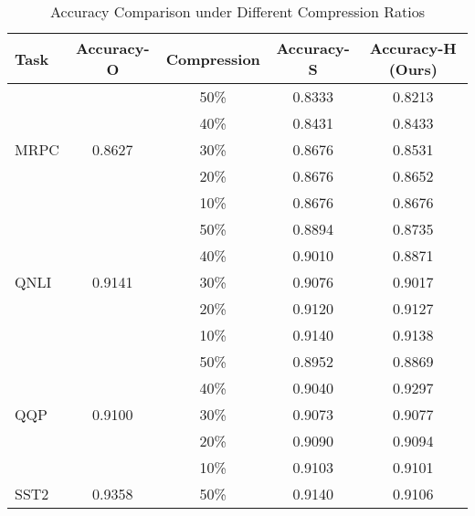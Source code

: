 \documentclass{article}
\begin{document}
\begin{table}[htbp]
\centering
\caption{Accuracy Comparison under Different Compression Ratios}
\begin{tabular}{lcccc}
\toprule
Task & Accuracy-O & Compression & Accuracy-S & \textbf{Accuracy-H (Ours)} \\
\midrule
\multirow{5}{*}{MRPC} 
     & \multirow{5}{*}{0.8627} & 50\% & \cellcolor{lightgray}0.8333 & \cellcolor{darkgray}0.8213 \\ %
     &                         & 40\% & \cellcolor{lightgray}0.8431 & \cellcolor{darkgray}0.8433 \\ %
     &                         & 30\% & \cellcolor{lightgray}0.8676 & \cellcolor{darkgray}0.8531 \\ %
     &                         & 20\% & \cellcolor{lightgray}0.8676 & \cellcolor{darkgray}0.8652 \\
     &                         & 10\% & \cellcolor{lightgray}0.8676 & \cellcolor{darkgray}0.8676 \\
\midrule
\multirow{5}{*}{QNLI} 
     & \multirow{5}{*}{0.9141} & 50\% & \cellcolor{lightgray}0.8894 & \cellcolor{darkgray}0.8735 \\
     &                         & 40\% & \cellcolor{lightgray}0.9010 & \cellcolor{darkgray}0.8871 \\
     &                         & 30\% & \cellcolor{lightgray}0.9076 & \cellcolor{darkgray}0.9017 \\
     &                         & 20\% & \cellcolor{lightgray}0.9120 & \cellcolor{darkgray}0.9127 \\
     &                         & 10\% & \cellcolor{lightgray}0.9140 & \cellcolor{darkgray}0.9138 \\
\midrule
\multirow{5}{*}{QQP} 
     & \multirow{5}{*}{0.9100} & 50\% & \cellcolor{lightgray}0.8952 & \cellcolor{darkgray}0.8869 \\
     &                         & 40\% & \cellcolor{lightgray}0.9040 & \cellcolor{darkgray}0.9297 \\
     &                         & 30\% & \cellcolor{lightgray}0.9073 & \cellcolor{darkgray}0.9077 \\
     &                         & 20\% & \cellcolor{lightgray}0.9090 & \cellcolor{darkgray}0.9094 \\
     &                         & 10\% & \cellcolor{lightgray}0.9103 & \cellcolor{darkgray}0.9101 \\
\midrule
\multirow{4}{*}{SST2} 
     & \multirow{4}{*}{0.9358} & 50\% & \cellcolor{lightgray}0.9140 & \cellcolor{darkgray}0.9106 \\

\end{tabular}
\end{table}
\end{document}
